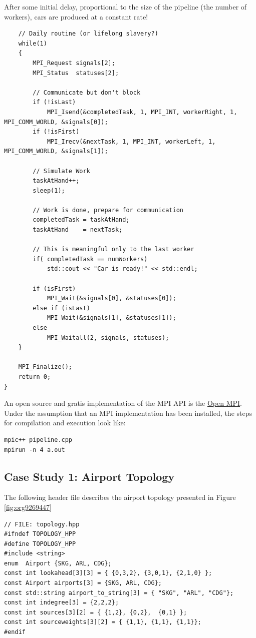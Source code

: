\documentclass[11pt]{article}
\begin{document}
After some initial delay, proportional to the size of the pipeline (the number of workers), cars are produced at a constant rate!
\begin{verbatim}
    // Daily routine (or lifelong slavery?)
    while(1)
    {
        MPI_Request signals[2];
        MPI_Status  statuses[2];

        // Communicate but don't block
        if (!isLast)
            MPI_Isend(&completedTask, 1, MPI_INT, workerRight, 1, MPI_COMM_WORLD, &signals[0]);
        if (!isFirst)
            MPI_Irecv(&nextTask, 1, MPI_INT, workerLeft, 1, MPI_COMM_WORLD, &signals[1]);

        // Simulate Work
        taskAtHand++;
        sleep(1);

        // Work is done, prepare for communication
        completedTask = taskAtHand;
        taskAtHand    = nextTask;

        // This is meaningful only to the last worker
        if( completedTask == numWorkers)
            std::cout << "Car is ready!" << std::endl;

        if (isFirst)
            MPI_Wait(&signals[0], &statuses[0]);
        else if (isLast)
            MPI_Wait(&signals[1], &statuses[1]);
        else
            MPI_Waitall(2, signals, statuses);
    }

    MPI_Finalize();
    return 0;
}
\end{verbatim}


An open source and gratis implementation of the MPI API is the \href{https://www.open-mpi.org/}{Open MPI}.
Under the assumption that an MPI implementation has been installed, the steps for compilation and execution look like:
\begin{verbatim}
mpic++ pipeline.cpp
mpirun -n 4 a.out
\end{verbatim}

\clearpage

\subsection{Case Study 1: Airport Topology}
\label{AppendixC}

The following header file describes the airport topology presented in Figure \ref{fig:org9269447}
\begin{verbatim}
// FILE: topology.hpp
#ifndef TOPOLOGY_HPP
#define TOPOLOGY_HPP
#include <string>
enum  Airport {SKG, ARL, CDG};
const int lookahead[3][3] = { {0,3,2}, {3,0,1}, {2,1,0} };
const Airport airports[3] = {SKG, ARL, CDG};
const std::string airport_to_string[3] = { "SKG", "ARL", "CDG"};
const int indegree[3] = {2,2,2};
const int sources[3][2] = { {1,2}, {0,2},  {0,1} };
const int sourceweights[3][2] = { {1,1}, {1,1}, {1,1}};
#endif
\end{verbatim}
\end{document}
